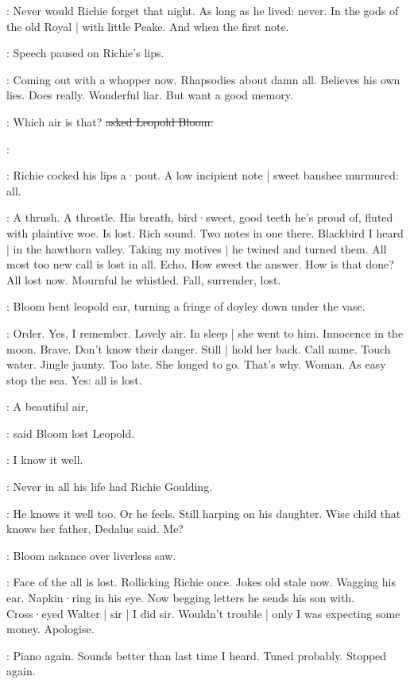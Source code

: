 :
Never would Richie forget that night.
As long as he lived:
never.
In the gods of the old Royal |
with little Peake.
And when the first note.

:
Speech paused on Richie's lips.

\BloomIntA:
Coming out with a whopper now.
Rhapsodies about damn all.
Believes his own lies.
Does really.
Wonderful liar.
But want a good memory.

\Bloom:
Which air is that?
\sout{asked Leopold Bloom.}

\goulding:

:
Richie cocked his lips a·pout.
A low incipient note |
sweet banshee murmured:
all.

\BloomIntB:
A thrush.
A throstle.
His breath,
bird·sweet,
good teeth he's proud of,
fluted with plaintive woe.
Is lost.
Rich sound.
Two notes in one there.
Blackbird I heard |
in the hawthorn valley.
Taking my motives |
he twined and turned them.
All most too new call is lost in all.
Echo.
How sweet the answer.
How is that done?
All lost now.
Mournful he whistled.
Fall,
surrender,
lost.

:
Bloom bent leopold ear,
turning a fringe of doyley down under the vase.

\BloomIntB:
Order.
Yes,
I remember.
Lovely air.
In sleep |
she went to him.
Innocence in the moon.
Brave.
Don't know their danger.
Still |
hold her back.
Call name.
Touch water.
Jingle jaunty.
Too late.
She longed to go.
That's why.
Woman.
As easy stop the sea.
Yes:
all is lost.

\Bloom:
A beautiful air,

:
said Bloom lost Leopold.

\Bloom:
I know it well.

:
Never in all his life had Richie Goulding.

\BloomIntA:
He knows it well too.
Or he feels.
Still harping on his daughter.
Wise child that knows her father,
Dedalus said.
Me?

:
Bloom askance over liverless saw.

\BloomIntA:
Face of the all is lost.
Rollicking
Richie once.
Jokes old stale now.
Wagging his ear.
Napkin·ring in his eye.
Now begging letters he sends his son with.
Cross·eyed Walter |
sir |
I did sir.
Wouldn't trouble |
only I was expecting some money.
Apologise.

\BloomIntA:
Piano again.
Sounds better than last time I heard.
Tuned probably.
Stopped again.

